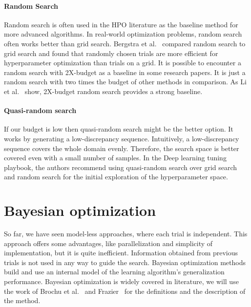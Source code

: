 \paragraph{Random Search} Random search is often used in the HPO literature as the baseline method for more advanced algorithms. In real-world optimization problems, random search often works better than grid search. Bergstra et al.~\cite{bergstra2012random} compared random search to grid search and found that randomly chosen trials are more efficient for hyperparameter optimization than trials on a grid. It is possible to encounter a random search with 2X-budget as a baseline in some research papers. It is just a random search with two times the budget of other methods in comparison. As Li et al.~\cite{li2018hyperband} show, 2X-budget random search provides a strong baseline.

\paragraph{Quasi-random search} If our budget is low then quasi-random search might be the better option. It works by generating a low-discrepancy sequence. Intuitively, a low-discrepancy sequence covers the whole domain evenly. Therefore, the search space is better covered even with a small number of samples. In the Deep learning tuning playbook, the authors recommend using quasi-random search over grid search and random search for the initial exploration of the hyperparameter space.



\section{Bayesian optimization}
So far, we have seen model-less approaches, where each trial is independent. This approach offers some advantages, like parallelization and simplicity of implementation, but it is quite inefficient. Information obtained from previous trials is not used in any way to guide the search. Bayesian optimization methods build and use an internal model of the learning algorithm's generalization performance. Bayesian optimization is widely covered in literature, we will use the work of Brochu et al.~\cite{brochu2010tutorial} and Frazier~\cite{frazier2018tutorial} for the definitions and the description of the method.

